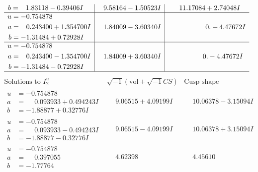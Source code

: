\documentclass[1p]{elsarticle_modified}
\theoremstyle{definition}
\newcommand{\I}{\sqrt{-1}}
\begin{document}
$$\begin{array}{c|c|c}
\begin{aligned}
b &= \phantom{-}1.83118 - 0.39406 I\end{aligned}
 & \phantom{-}9.58164 - 1.50523 I & \phantom{-}11.17084 + 2.74048 I \\ \hline\begin{aligned}
u &= -0.754878\phantom{ +0.000000I} \\
a &= \phantom{-}0.243400 + 1.354700 I \\
b &= -1.31484 + 0.72928 I\end{aligned}
 & \phantom{-}1.84009 - 3.60340 I & \phantom{-0.000000 -}0. + 4.47672 I \\ \hline\begin{aligned}
u &= -0.754878\phantom{ +0.000000I} \\
a &= \phantom{-}0.243400 - 1.354700 I \\
b &= -1.31484 - 0.72928 I\end{aligned}
 & \phantom{-}1.84009 + 3.60340 I & \phantom{-0.000000 } 0. - 4.47672 I\\
 \hline 
 \end{array}$$\newpage$$\begin{array}{c|c|c}  
\text{Solutions to }I^u_{2}& \I (\text{vol} + \sqrt{-1}CS) & \text{Cusp shape}\\
 \hline 
\begin{aligned}
u &= -0.754878\phantom{ +0.000000I} \\
a &= \phantom{-}0.093933 + 0.494243 I \\
b &= -1.88877 + 0.32776 I\end{aligned}
 & \phantom{-}9.06515 + 4.09199 I & \phantom{-}10.06378 - 3.15094 I \\ \hline\begin{aligned}
u &= -0.754878\phantom{ +0.000000I} \\
a &= \phantom{-}0.093933 - 0.494243 I \\
b &= -1.88877 - 0.32776 I\end{aligned}
 & \phantom{-}9.06515 - 4.09199 I & \phantom{-}10.06378 + 3.15094 I \\ \hline\begin{aligned}
u &= -0.754878\phantom{ +0.000000I} \\
a &= \phantom{-}0.397055\phantom{ +0.000000I} \\
b &= -1.77764\phantom{ +0.000000I}\end{aligned}
 & \phantom{-}4.62398\phantom{ +0.000000I} & \phantom{-}4.45610\phantom{ +0.000000I} \\ \hline\begin{aligned}

\end{aligned}
\end{array}$$
\end{document}
